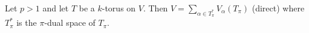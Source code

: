 Let $p > 1$ and let $T$ be a $k$-torus on $V$. Then $V = \sum_{\alpha \in T_\pi^*} V_\alpha(T_\pi)$ (direct) where $T_\pi^*$ is the $\pi$-dual space of $T_\pi$.
